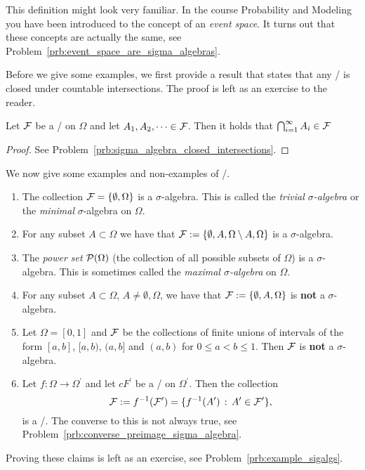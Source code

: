 This definition might look very familiar. In the course Probability and Modeling you have been introduced to the concept of an \emph{event space}. It turns out that these concepts are actually the same, see Problem~\ref{prb:event_space_are_sigma_algebras}.

Before we give some examples, we first provide a result that states that any \sigalg/ is closed under countable intersections. The proof is left as an exercise to the reader.

\begin{lemma}\label{lem:sigma_algebra_closed_intersections}
Let $\mathcal F$ be a \sigalg/ on $\Omega$ and let $A_1, A_2, \dots \in \mathcal F$. Then it holds that $\bigcap_{i = 1}^\infty A_i \in \mathcal F$
\end{lemma}
\begin{proof}
See Problem~\ref{prb:sigma_algebra_closed_intersections}.
\end{proof}

We now give some examples and non-examples of \sigalgs/.

\begin{example}\label{example:sigma_algebras}
\hfil
\begin{enumerate}[label=(\alph*)]
\item The collection $\mathcal F = \{\emptyset, \Omega\}$ is a $\sigma$-algebra. This is called the \emph{trivial $\sigma$-algebra} or the \emph{minimal} $\sigma$-algebra on $\Omega$.
\item For any subset $A \subset \Omega$ we have that $\mathcal F := \{\emptyset, A, \Omega\setminus A, \Omega\}$ is a $\sigma$-algebra.
\item The \emph{power set} $\mathcal P(\Omega)$ (the collection of all possible subsets of $\Omega$) is a $\sigma$-algebra. This is sometimes called the \emph{maximal $\sigma$-algebra} on $\Omega$.
\item For any subset $A \subset \Omega$, $A \ne \emptyset, \Omega$, we have that $\mathcal F := \{\emptyset, A, \Omega\}$ is \textbf{not} a $\sigma$-algebra.
\item Let $\Omega = [0,1]$ and $\mathcal F$ be the collections of finite unions of intervals of the form $[a,b]$, $[a,b)$, $(a,b]$ and $(a,b)$ for $0 \le a < b \le 1$. Then $\mathcal F$ is \textbf{not} a $\sigma$-algebra.
\item Let $f : \Omega \to \Omega^\prime$ and let $cF^\prime$ be a \sigalg/ on $\Omega^\prime$. Then the collection
\[
	\mathcal F := f^{-1}(\mathcal F^\prime) = \{f^{-1}(A^\prime) \, : \, A^\prime \in \mathcal F^\prime\},
\]
is a \sigalg/. The converse to this is not always true, see Problem~\ref{prb:converse_preimage_sigma_algebra}.
\end{enumerate}
Proving these claims is left as an exercise, see Problem~\ref{prb:example_sigalgs}.
\end{example}

